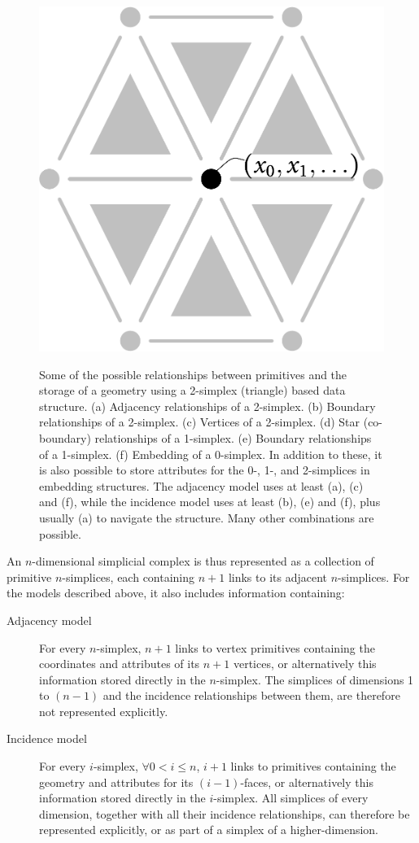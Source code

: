 \begin{figure}[tbp]
{\includegraphics[scale=0.2]{figs/0-simplex}}
\caption[Relationships in a simplex-based data structure]{Some of the possible relationships between primitives and the storage of a geometry using a 2-simplex (triangle) based data structure.
(a) Adjacency relationships of a 2-simplex.
(b) Boundary relationships of a 2-simplex.
(c) Vertices of a 2-simplex.
(d) Star (co-boundary) relationships of a 1-simplex.
(e) Boundary relationships of a 1-simplex.
(f) Embedding of a 0-simplex.
In addition to these, it is also possible to store attributes for the 0-, 1-, and 2-simplices in embedding structures.
The adjacency model uses at least (a), (c) and (f), while the incidence model uses at least (b), (e) and (f), plus usually (a) to navigate the structure.
Many other combinations are possible.
}
\label{fig:ds_simplex}
\end{figure}

An $n$-dimensional simplicial complex is thus represented as a collection of primitive $n$-simplices, each containing $n+1$ links to its adjacent $n$-simplices.
For the models described above, it also includes information containing:
\begin{description}
\item[Adjacency model]
For every $n$-simplex, $n+1$ links to vertex primitives containing the coordinates and attributes of its $n+1$ vertices, or alternatively this information stored directly in the $n$-simplex. The simplices of dimensions 1 to $(n-1)$ and the incidence relationships between them, are therefore not represented explicitly.
\item[Incidence model]
For every $i$-simplex, $\forall 0 < i \leq n$, $i+1$ links to primitives containing the geometry and attributes for its $(i-1)$-faces, or alternatively this information stored directly in the $i$-simplex.
All simplices of every dimension, together with all their incidence relationships, can therefore be represented explicitly, or as part of a simplex of a higher-dimension.
\end{description}

